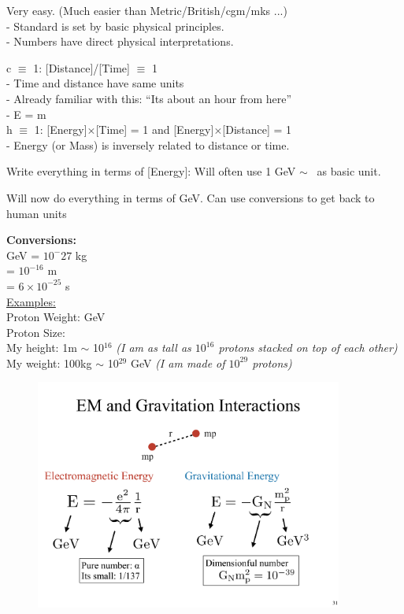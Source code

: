 {Very easy. (Much easier than Metric/British/cgm/mks ...) \\
- Standard is set by basic physical principles.\\
- Numbers have direct physical interpretations.

c $\equiv$ 1: [Distance]/[Time] $\equiv$ 1\\
- Time and distance have same units\\
- Already familiar with this: ``Its about an hour from here''\\
- E = m\\

h $\equiv$ 1: [Energy]$\times$[Time] = 1 and [Energy]$\times$[Distance] = 1\\
- Energy (or Mass) is inversely related to distance or time.

Write everything in terms of [Energy]: Will often use 1 GeV $\sim$ \mp\ as basic unit.

Will now do everything in terms of GeV. 
Can use conversions to get back to human units

\textbf{Conversions:}\\
GeV = $10^-27 $ kg\\
\iGeV = $10^{-16}$ m\\
\iGeV = $6 \times 10^{-25}$ s\\

\underline{Examples:}\\
Proton Weight:  GeV \\
Proton Size:    \iGeV \\
My height: 1m $\sim$ 10$^{16}$ \iGeV \textit{(I am as tall as $10^{16}$ protons stacked on top of each other)}\\
My weight: 100kg $\sim$ 10$^{29}$ GeV \textit{(I am made of $10^{29}$ protons)}


\begin{figure}[h]
\centering
\includegraphics[width=0.9\textwidth]{./EMandGravity.pdf}
\end{figure}

}
